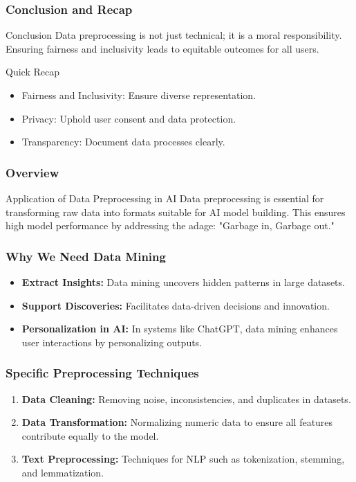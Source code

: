 \documentclass[aspectratio=169]{beamer}
\begin{document}
\begin{frame}[fragile]
    \frametitle{Conclusion and Recap}
    \begin{block}{Conclusion}
        Data preprocessing is not just technical; it is a moral responsibility. Ensuring fairness and inclusivity leads to equitable outcomes for all users.
    \end{block}
    \begin{block}{Quick Recap}
        \begin{itemize}
            \item Fairness and Inclusivity: Ensure diverse representation.
            \item Privacy: Uphold user consent and data protection.
            \item Transparency: Document data processes clearly.
        \end{itemize}
    \end{block}
\end{frame}

\begin{frame}[fragile]
    \frametitle{Overview}
    \begin{block}{Application of Data Preprocessing in AI}
        Data preprocessing is essential for transforming raw data into formats suitable for AI model building. This ensures high model performance by addressing the adage: "Garbage in, Garbage out."
    \end{block}
\end{frame}

\begin{frame}[fragile]
    \frametitle{Why We Need Data Mining}
    \begin{itemize}
        \item \textbf{Extract Insights:} 
            Data mining uncovers hidden patterns in large datasets.
        \item \textbf{Support Discoveries:} 
            Facilitates data-driven decisions and innovation.
        \item \textbf{Personalization in AI:} 
            In systems like ChatGPT, data mining enhances user interactions by personalizing outputs.
    \end{itemize}
\end{frame}

\begin{frame}[fragile]
    \frametitle{Specific Preprocessing Techniques}
    \begin{enumerate}
        \item \textbf{Data Cleaning:} 
            Removing noise, inconsistencies, and duplicates in datasets.
        \item \textbf{Data Transformation:} 
            Normalizing numeric data to ensure all features contribute equally to the model.
        \item \textbf{Text Preprocessing:} 
            Techniques for NLP such as tokenization, stemming, and lemmatization.
    \end{enumerate}
\end{frame}
\end{document}
